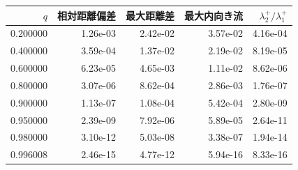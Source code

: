 \begin{tabular}{rrrrr}\toprule
$q$ & 相対距離偏差 & 最大距離差 & 最大内向き流 & $\lambda_2^+/\lambda_1^+$\\\midrule
0.200000 & 1.26e-03 & 2.42e-02 & 3.57e-02 & 4.16e-04 \\
0.400000 & 3.59e-04 & 1.37e-02 & 2.19e-02 & 8.19e-05 \\
0.600000 & 6.23e-05 & 4.65e-03 & 1.11e-02 & 8.62e-06 \\
0.800000 & 3.07e-06 & 8.62e-04 & 2.86e-03 & 1.76e-07 \\
0.900000 & 1.13e-07 & 1.08e-04 & 5.42e-04 & 2.80e-09 \\
0.950000 & 2.39e-09 & 7.92e-06 & 5.89e-05 & 2.64e-11 \\
0.980000 & 3.10e-12 & 5.03e-08 & 3.38e-07 & 1.94e-14 \\
0.996008 & 2.46e-15 & 4.77e-12 & 5.94e-16 & 8.33e-16 \\
\bottomrule\end{tabular}
